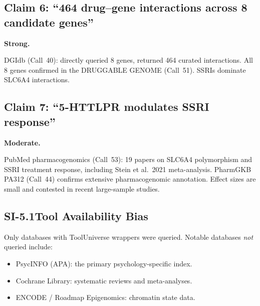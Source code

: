 \subsection*{Claim 6: ``464 drug--gene interactions across 8 candidate
genes''}

\begin{description}[style=nextline, nosep]
  \item[Grade] \textbf{Strong.}
  \item[Evidence chain]
    DGIdb (Call~40): directly queried 8 genes, returned 464 curated
    interactions.  All 8 genes confirmed in the DRUGGABLE GENOME
    (Call~51).  SSRIs dominate SLC6A4 interactions.
\end{description}

\subsection*{Claim 7: ``5-HTTLPR modulates SSRI response''}

\begin{description}[style=nextline, nosep]
  \item[Grade] \textbf{Moderate.}
  \item[Evidence chain]
    PubMed pharmacogenomics (Call~53): 19 papers on SLC6A4 polymorphism
    and SSRI treatment response, including Stein et al.\ 2021 meta-analysis.
    PharmGKB PA312 (Call~44) confirms extensive pharmacogenomic annotation.
    Effect sizes are small and contested in recent large-sample studies.
\end{description}



\subsection*{SI-5.1\quad Tool Availability Bias}

Only databases with ToolUniverse wrappers were queried.  Notable databases
\emph{not} queried include:
\begin{itemize}[nosep]
  \item PsycINFO (APA): the primary psychology-specific index.
  \item Cochrane Library: systematic reviews and meta-analyses.
  \item ENCODE / Roadmap Epigenomics: chromatin state data.
\end{itemize}

